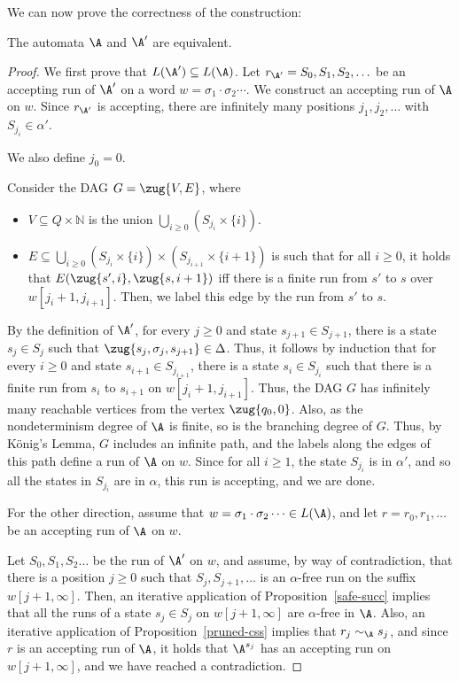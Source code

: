 \documentclass{lmcs}
\begin{document}
We can now prove the correctness of the construction:

\begin{prop}\label{A and A_D are equiv}
	The automata $\A$ and $\A'$ are equivalent.
\end{prop}

\begin{proof}
We first prove that $L(\A') \subseteq L(\A)$. Let $r_{\A'}=S_0, S_1, S_2, \ldots $ be an accepting run of $\A'$ on a  word $w = \sigma_1 \cdot \sigma_2 \cdots$. We construct an accepting run of $\A$ on $w$. Since $r_{\A'}$ is accepting, there are infinitely many positions $j_1,j_2,\ldots$ with $S_{j_i} \in \alpha'$. 

We also define $j_0 = 0$.

\noindent %
	Consider the DAG $G= \zug{V, E}$, where 
	\begin{itemize}
		\item 	 $V\subseteq Q\times \mathbb{N}$ is the union $\bigcup_{i\geq 0}(S_{j_i} \times \{i\})$.
		
		\item $E\subseteq \bigcup_{i\geq 0} (S_{j_i} \times \{i\}) \times (S_{j_{i+1}} \times \{i+1\})$ is such that for all $i\geq 0$, it holds that $E(\zug{s', i}, \zug{s, i+1})$ iff there is a finite run from $s'$ to $s$ over $w[j_i + 1, j_{i+1} ] $. Then, we label this edge by the run from $s'$ to $s$. 
	\end{itemize}
	By the definition of $\A'$, for every $j \geq 0$ and state $s_{j+1}\in S_{j+1}$, there is a state $s_j\in S_j$ such that $\zug{s_j, \sigma_j, s_{j+1}} \in \Delta$. Thus, it follows by induction that for every $i \geq 0$ and state $s_{i+1}  \in S_{j_{i+1}}$, there is a state $s_i \in S_{j_i}$ such that there is a finite run from $s_i$ to $s_{i+1}$ on $w[j_i + 1, j_{i+1} ] $. Thus, the DAG $G$ has infinitely many reachable vertices from the vertex $\zug{q_0, 0}$. Also, as the nondeterminism degree of $\A$ is finite, so is the branching degree of $G$. Thus, by K\"onig's Lemma, $G$ includes an infinite path, and the labels along the edges of this path define a run of $\A$ on $w$. Since for all $i \geq 1$, the state $S_{j_i}$  is in $\alpha'$, and so all the states in $S_{j_i}$ are in $\alpha$, this run is accepting, and we are done. 

	
	For the other direction, assume that $w = \sigma_1 \cdot \sigma_2 \cdots \in L(\A)$, and let $r=r_0, r_1, \ldots $ be an accepting run of $\A$ on $w$.
	
	Let $S_0, S_1, S_2 \ldots $ be the run of $\A'$ on $w$, and assume, by way of contradiction, that there is a position $j\geq 0$ such that $S_j, S_{j+1}, \ldots $ is an $\alpha$-free run on the suffix $w[j+1, \infty]$. Then, an iterative application of Proposition~\ref{safe-succ} implies that all the runs of a state $s_j \in S_j$ on  $w[j+1, \infty]$ are $\alpha$-free in $\A$. Also, an iterative application of Proposition~\ref{pruned-css} implies that $r_j \sim_\A s_j$, and since $r$ is an accepting run of $\A$, it holds that $\A^{s_j}$ has an accepting run on $w[j+1, \infty]$, and we have reached a contradiction.
	
\end{proof}
\end{document}
